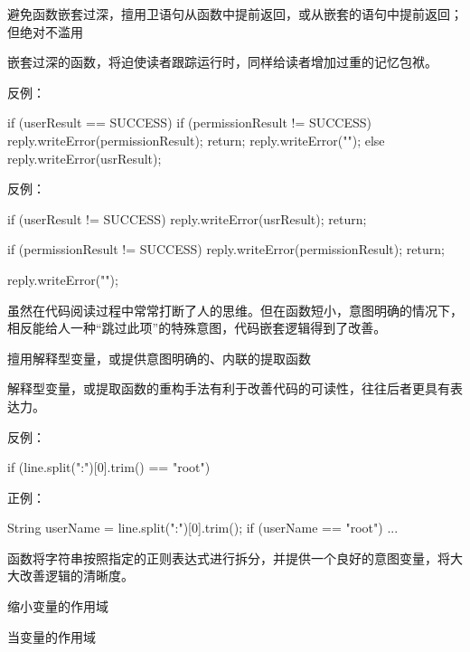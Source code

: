 \begin{content}
\begin{regulation}
避免函数嵌套过深，擅用卫语句从函数中提前返回，或从嵌套的语句中提前返回；但绝对不滥用
\end{regulation}

嵌套过深的函数，将迫使读者跟踪运行时，同样给读者增加过重的记忆包袱。

反例：
\begin{leftbar}
\begin{c++}
if (userResult == SUCCESS)
{
    if (permissionResult != SUCCESS)
    {
        reply.writeError(permissionResult);
        return;
    }
    reply.writeError("");
}
else
{
    reply.writeError(usrResult);
}
\end{c++}
\end{leftbar}

反例：
\begin{leftbar}
\begin{c++}
if (userResult != SUCCESS)
{
    reply.writeError(usrResult);
    return;
}

if (permissionResult != SUCCESS)
{
    reply.writeError(permissionResult);
    return;
}

reply.writeError("");

\end{c++}
\end{leftbar}

虽然在代码阅读过程中常常打断了人的思维。但在函数短小，意图明确的情况下，相反能给人一种“跳过此项”的特殊意图，代码嵌套逻辑得到了改善。

\begin{regulation}
擅用解释型变量，或提供意图明确的、内联的提取函数
\end{regulation}

解释型变量，或提取函数的重构手法有利于改善代码的可读性，往往后者更具有表达力。

反例：
\begin{leftbar}
\begin{c++}
if (line.split(":")[0].trim() == "root")
\end{c++}
\end{leftbar}

正例：
\begin{leftbar}
\begin{c++}
String userName = line.split(":")[0].trim();
if (userName == "root")
{
    ...
}
\end{c++}
\end{leftbar}

函数将字符串按照指定的正则表达式进行拆分，并提供一个良好的意图变量，将大大改善逻辑的清晰度。

\begin{regulation}
缩小变量的作用域
\end{regulation}

当变量的作用域

\end{content}
